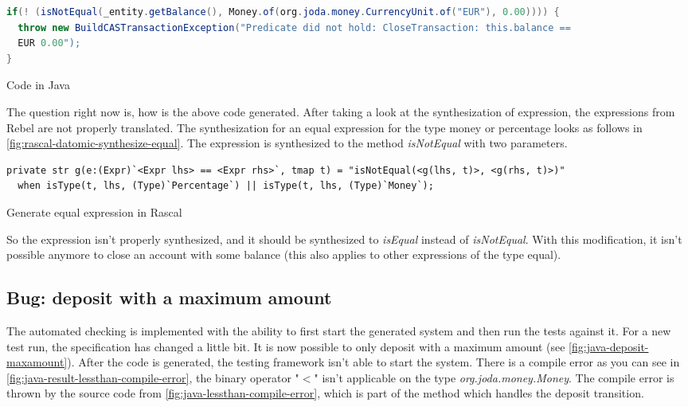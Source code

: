 \begin{sourcecode}[h!]
\begin{lstlisting}[language=Java]
if(! (isNotEqual(_entity.getBalance(), Money.of(org.joda.money.CurrencyUnit.of("EUR"), 0.00)))) {
  throw new BuildCASTransactionException("Predicate did not hold: CloseTransaction: this.balance ==
  EUR 0.00");
}
\end{lstlisting}
\caption{Code in Java}
\label{fig:java-notequal-check}
\end{sourcecode}

The question right now is, how is the above code generated.
 After taking a look at the synthesization of
expression, the expressions from Rebel are not properly translated. The
synthesization for an equal expression for the type money or percentage looks as
follows in \autoref{fig:rascal-datomic-synthesize-equal}. The expression is
synthesized to the method \textit{isNotEqual} with two parameters.

\begin{sourcecode}[h!]
\begin{lstlisting}[]
private str g(e:(Expr)`<Expr lhs> == <Expr rhs>`, tmap t) = "isNotEqual(<g(lhs, t)>, <g(rhs, t)>)"
  when isType(t, lhs, (Type)`Percentage`) || isType(t, lhs, (Type)`Money`);
\end{lstlisting}
\caption{Generate equal expression in Rascal}
\label{fig:rascal-datomic-synthesize-equal}
\end{sourcecode}

So the expression isn't properly synthesized, and it should be synthesized to
\textit{isEqual} instead of \textit{isNotEqual}. With this modification, it
isn't possible anymore to close an account with some balance (this also applies
to other expressions of the type equal).

\subsection{Bug: deposit with a maximum amount}
\label{sec:bug-compile-max-deposit}

The automated checking is implemented with the ability to first start the
generated system and then run the tests against it. For a new test run, the
specification has changed a little bit. It is now possible to only deposit with
a maximum amount (see \autoref{fig:java-deposit-maxamount}). After the code is
generated, the testing framework isn't able to start the system. There is a
compile error as you can see in
\autoref{fig:java-result-lessthan-compile-error}, the binary operator "$<$"
isn't applicable on the type \textit{org.joda.money.Money}. The compile error
is thrown by the source code from \autoref{fig:java-lessthan-compile-error},
which is part of the method which handles the deposit transition.

